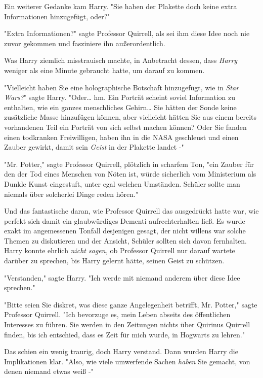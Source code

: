 {Ein weiterer Gedanke kam Harry. "Sie haben der Plakette doch keine extra Informationen hinzugefügt, oder?"

"Extra Informationen?" sagte Professor Quirrell, als sei ihm diese Idee noch nie zuvor gekommen und fasziniere ihn außerordentlich.

Was Harry ziemlich misstrauisch machte, in Anbetracht dessen, dass \emph{Harry} weniger als eine Minute gebraucht hatte, um darauf zu kommen.

"Vielleicht haben Sie eine holographische Botschaft hinzugefügt, wie in \emph{Star Wars?}" sagte Harry. "Oder… hm. Ein Porträt scheint soviel Information zu enthalten, wie ein ganzes menschliches Gehirn… Sie hätten der Sonde keine zusätzliche Masse hinzufügen können, aber vielleicht hätten Sie aus einem bereits vorhandenen Teil ein Porträt von sich selbst machen können? Oder Sie fanden einen todkranken Freiwilligen, haben ihn in die NASA geschleust und einen Zauber gewirkt, damit sein \emph{Geist} in der Plakette landet -"

"Mr. Potter," sagte Professor Quirrell, plötzlich in scharfem Ton, "ein Zauber für den der Tod eines Menschen von Nöten ist, würde sicherlich vom Ministerium als Dunkle Kunst eingestuft, unter egal welchen Umständen. Schüler sollte man niemals über solcherlei Dinge reden hören."

Und das fantastische daran, wie Professor Quirrell das ausgedrückt hatte war, wie perfekt sich damit ein glaubwürdiges Dementi aufrechterhalten ließ. Es wurde exakt im angemessenen Tonfall desjenigen gesagt, der nicht willens war solche Themen zu diskutieren und der Ansicht, Schüler sollten sich davon fernhalten. Harry konnte ehrlich \emph{nicht sagen,} ob Professor Quirrell nur darauf wartete darüber zu sprechen, bis Harry gelernt hätte, seinen Geist zu schützen.

"Verstanden," sagte Harry. "Ich werde mit niemand anderem über diese Idee sprechen."

"Bitte seien Sie diskret, was diese ganze Angelegenheit betrifft, Mr. Potter," sagte Professor Quirrell. "Ich bevorzuge es, mein Leben abseits des öffentlichen Interesses zu führen. Sie werden in den Zeitungen nichts über Quirinus Quirrell finden, bis ich entschied, dass es Zeit für mich wurde, in Hogwarts zu lehren."

Das schien ein wenig traurig, doch Harry verstand. Dann wurden Harry die Implikationen klar. "Also, wie viele umwerfende Sachen \emph{haben} Sie gemacht, von denen niemand etwas weiß -"

}
